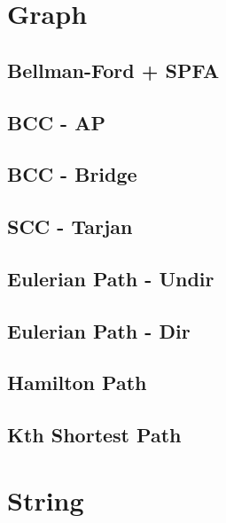 \documentclass[a4paper,10pt,twocolumn,oneside]{article}
\begin{document}
\section{Graph}

\subsection{Bellman-Ford + SPFA}


\subsection{BCC - AP}


\subsection{BCC - Bridge}


\subsection{SCC - Tarjan}


\subsection{Eulerian Path - Undir}


\subsection{Eulerian Path - Dir}


\subsection{Hamilton Path}


\subsection{Kth Shortest Path}


\section{String}
\end{document}
